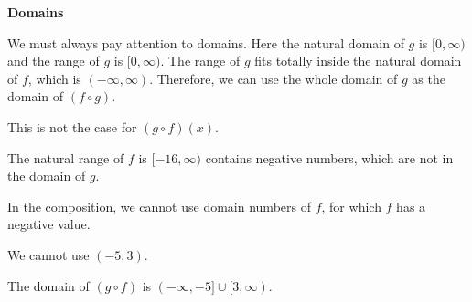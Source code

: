 \documentclass{ximera}
\begin{document}
\begin{observation} \textbf{\textcolor{-red!75}{Domains}}


We must always pay attention to domains.  Here the natural domain of $g$ is $[0, \infty)$ and the range of $g$ is $[0, \infty)$.  The range of $g$ fits totally inside the natural domain of $f$, which is $(-\infty, \infty)$.  Therefore, we can use the whole domain of $g$ as the domain of $(f \circ g)$.

This is not the case for $(g \circ f)(x)$.


The natural range of $f$ is $[-16, \infty)$ contains negative numbers, which are not in the domain of $g$.

In the composition, we cannot use domain numbers of $f$, for which $f$ has a negative value.

We cannot use $(-5, 3)$.

The domain of $(g \circ f)$ is $(-\infty, -5] \cup [3, \infty)$.


\end{observation}
\end{document}
